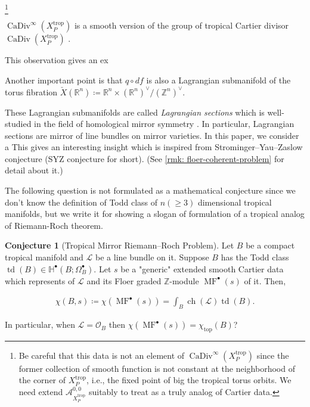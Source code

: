 \documentclass[a4paper,dvipdfmx,reqno,12pt]{amsart}
\theoremstyle{definition}
\newtheorem{Conj}[Thm]{Conjecture}
\newcommand{\deq}{\coloneqq}
\newcommand{\R}{\mathbb{R}}%
\newcommand{\Z}{\mathbb{Z}}%
\newcommand{\mb}[1]{\mathbb{#1}}%
\newcommand{\mcal}[1]{\mathcal{#1}}%
\newcommand{\opn}[1]{\operatorname{#1}}
\numberwithin{equation}{section}
\begin{document}
\footnote{Be careful that this data is not an element
of $\opn{CaDiv}^{\infty}(X_{P}^{\opn{trop}})$ since
 the former collection of smooth function is not constant
at the neighborhood of the corner of $X_{P}^{\opn{trop}}$,
i.e., the fixed point of big the tropical torus orbits.
We need extend $\mcal{A}^{0,0}_{X_{P}^{\opn{trop}}}$
suitably to treat as a truly analog of Cartier data.}



$\opn{CaDiv}^{\infty}(X_{P}^{\opn{trop}})$ is a
smooth version of the group of tropical Cartier divisor
$\opn{CaDiv}(X_{P}^{\opn{trop}})$ 
\cite[Definition 4.2]{jellLefschetzTheoremTropical2018a}.

This observation gives an ex

Another important point is that $q\circ df$ is also a Lagrangian
submanifold of the torus fibration $\check{X}(\R^{n})\deq \R^{n}\times (\R^{n})^{\vee}/(\Z^{n})^{\vee}$.


These Lagrangian submanifolds are called
\emph{Lagrangian sections} 
which is well-studied in the field of homological 
mirror symmetry 
\cite{kontsevichAffineStructuresNonArchimedean2006a,MR2452307}.
In particular, Lagrangian sections are mirror of line bundles on
mirror varieties. 
In this paper, we consider a 
This gives an interesting insight which is inspired from
Strominger--Yau--Zaslow conjecture 
(SYZ conjecture for short).
(See \cref{rmk: floer-coherent-problem} 
for detail about it.)

The following question is not formulated as a mathematical 
conjecture since we don't know the definition of Todd 
class of $n(\geq 3)$ dimensional tropical manifolds,
but we write it for showing a slogan of formulation 
of a tropical analog of Riemann-Roch theorem.

\begin{Conj}[{Tropical Mirror Riemann--Roch Problem}]
Let $B$ be a compact tropical manifold and $\mcal{L}$
be a line bundle on it. Suppose $B$ has the Todd class
$\opn{td}(B) \in \mb{H}^{\bullet}(B;\Omega_B^{\bullet})$.
 Let $s$ be a "generic"
extended smooth Cartier data which represents of $\mcal{L}$
and its Floer graded $\Z$-module $\opn{MF}^{\bullet}(s)$
of it. Then,

\begin{align}
\chi(B,s)  \deq \chi(\opn{MF}^{\bullet}(s))=\int_B \opn{ch}(\mcal{L})\opn{td}(B).
\end{align}

In particular, when $\mcal{L}=\mcal{O}_B$ then
$\chi(\opn{MF}^{\bullet}(s))=\chi_{\opn{top}}(B)$?
\end{Conj}
\end{document}
